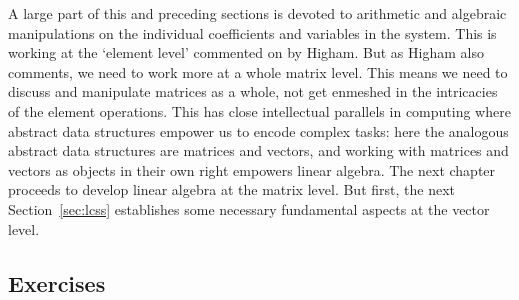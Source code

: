 A large part of this and preceding sections is devoted to arithmetic and algebraic manipulations on the individual coefficients and variables in the system. 
This is working at the `element level' commented on by Higham.
But as Higham also comments, we need to work more at a whole matrix level.
This means we need to discuss and manipulate matrices as a whole, not  get enmeshed in the intricacies of the element operations.
This has close intellectual parallels in computing where abstract data structures empower us to encode complex tasks: here the analogous abstract data structures are matrices and vectors, and working with matrices and vectors as objects in their own right empowers linear algebra.
The next chapter proceeds to develop linear algebra at the matrix level.
But first, the next Section~\ref{sec:lcss} establishes some necessary fundamental aspects at the vector level.




\subsection{Exercises}


